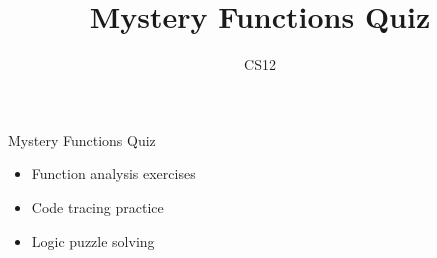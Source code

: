 \documentclass{beamer}
\title{Mystery Functions Quiz}
\author{CS12}
\date{}
\begin{document}
\begin{frame}
    \titlepage
\end{frame}

\begin{frame}{Mystery Functions Quiz}
    \begin{itemize}
        \item Function analysis exercises
        \item Code tracing practice
        \item Logic puzzle solving
    \end{itemize}
\end{frame}
\end{document}
